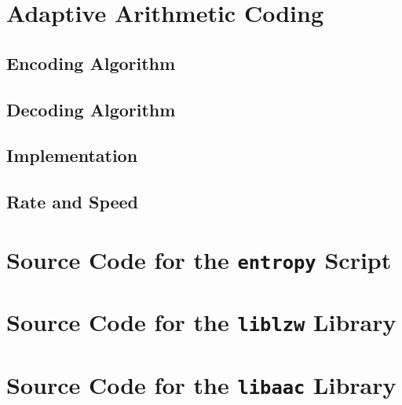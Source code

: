 \documentclass[a4paper, twocolumn]{article}
\begin{document}
    \clearpage
    \section{Adaptive Arithmetic Coding} \label{sec:adaptive_arithmetic_coding}
        \subsection{Encoding Algorithm} \label{sec:aac_encoding_algorithm}
        \subsection{Decoding Algorithm} \label{sec:aac_decoding_algorithm}
        \subsection{Implementation} \label{sec:aac_implementation}
        \subsection{Rate and Speed} \label{sec:aac_rate_and_speed}

    \appendix \onecolumn

    \clearpage
    \section{Source Code for the \texttt{entropy} Script} \label{sec:script}

    \clearpage
    \section{Source Code for the \texttt{liblzw} Library} \label{sec:liblzw}

    \clearpage
    \section{Source Code for the \texttt{libaac} Library} \label{sec:libaac}
\end{document}
